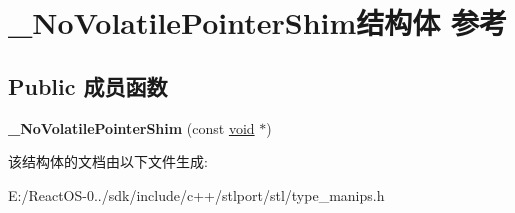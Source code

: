 \hypertarget{struct___no_volatile_pointer_shim}{}\section{\+\_\+\+No\+Volatile\+Pointer\+Shim结构体 参考}
\label{struct___no_volatile_pointer_shim}
\subsection*{Public 成员函数}
\begin{DoxyCompactItemize}
\item 
\mbox{\label{struct___no_volatile_pointer_shim_a61e559c4ab68a8e036b55d160781a187}} 
{\bfseries \+\_\+\+No\+Volatile\+Pointer\+Shim} (const \hyperlink{interfacevoid}{void} $\ast$)
\end{DoxyCompactItemize}


该结构体的文档由以下文件生成\+:\begin{DoxyCompactItemize}
\item 
E\+:/\+React\+O\+S-\/0../sdk/include/c++/stlport/stl/type\+\_\+manips.\+h\end{DoxyCompactItemize}
